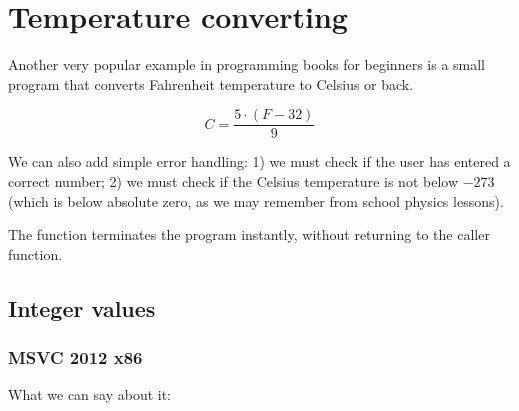 \chapter{Temperature converting}

Another very popular example in 
programming books for beginners is a small program that converts Fahrenheit temperature to Celsius or back.

\[
	C=\frac{5 \cdot (F-32)}{9}
\]

We can also add simple error handling:
1) we must check if the user has entered a correct number;
2) we must check if the Celsius temperature is not below $-273$ 
(which is below absolute zero, as we may remember from school physics lessons).

The  function terminates 
the program instantly, without returning to the \gls{caller} function.

\section{Integer values}



\subsection{\Optimizing MSVC 2012 x86}



What we can say about it:

